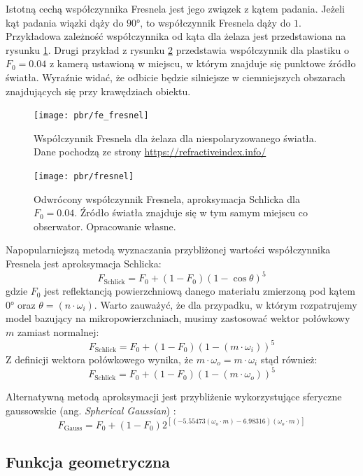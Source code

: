 \documentclass[../main.tex]{subfiles}
\begin{document}
Istotną cechą współczynnika Fresnela jest jego związek z kątem padania. Jeżeli kąt padania wiązki dąży do $\ang{90}$, to współczynnik Fresnela dąży do $1$. Przykładowa zależność współczynnika od kąta dla żelaza jest przedstawiona na rysunku \ref{fig:fe_fresnel}. Drugi przykład z rysunku \ref{fig:schlick_fresnel} przedstawia współczynnik dla plastiku o $F_0 = 0.04$ z kamerą ustawioną w miejscu, w którym znajduje się punktowe źródło światła. Wyraźnie widać, że odbicie będzie silniejsze w ciemniejszych obszarach znajdujących się przy krawędziach obiektu.

\begin{figure}[ht]
    \centering
    \texttt{[image: pbr/fe\_fresnel]}
    \caption{Współczynnik Fresnela dla żelaza dla niespolaryzowanego światła. Dane pochodzą ze strony \url{https://refractiveindex.info/}}
    \label{fig:fe_fresnel}
\end{figure}

\begin{figure}[h]
    \centering
    \texttt{[image: pbr/fresnel]}
    \caption{Odwrócony współczynnik Fresnela, aproksymacja Schlicka dla $F_0 = 0.04$. Źródło światła znajduje się w tym samym miejscu co obserwator. Opracowanie własne.}
    \label{fig:schlick_fresnel}
\end{figure}

Napopularniejszą metodą wyznaczania przybliżonej wartości współczynnika Fresnela jest aproksymacja Schlicka:
\[
    F_{\text{Schlick}} = F_0 + (1-F_0)(1-\cos\theta)^5
\]
\noindent gdzie $F_0$ jest reflektancją powierzchniową danego materiału zmierzoną pod kątem $\ang{0}$ oraz $\theta = (n \cdot \omega_i)$. Warto zauważyć, że dla przypadku, w którym rozpatrujemy model bazujący na mikropowierzchniach, musimy zastosować wektor połówkowy $m$ zamiast normalnej:
\[
    F_{\text{Schlick}} = F_0 + (1-F_0)\left(
        1 - \left(
            m \cdot \omega_i
        \right)
    \right)^5
\]
\noindent Z definicji wektora połówkowego wynika, że $m \cdot \omega_o = m \cdot \omega_i$ stąd również:
\[
F_{\text{Schlick}} = F_0 + (1-F_0)(1 - (m \cdot \omega_o))^5
\]

Alternatywną metodą aproksymacji jest przybliżenie wykorzystujące sferyczne gaussowskie (ang. \textit{Spherical Gaussian}) \cite{pbr_ue4,SphericalGaussianLegarde}:
\[
    F_{\text{Gauss}} = F_0 +(1−F_0) 2^{\left[
        \left(
            −5.55473\left(\omega_o \cdot m\right)−6.98316
        \right) 
        (\omega_o \cdot m)
  \right]}
\]

\subsection{Funkcja geometryczna}
\end{document}

